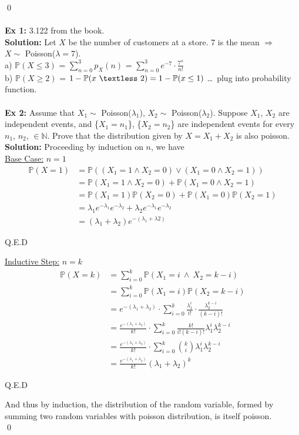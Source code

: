\documentclass{article}
\newcommand{\N}{\mathbb{N}}
\newcommand{\bbP}{\mathbb{P}}
\newcommand{\la}{\lambda}
\newcommand{\lt}{\textless}
\newcommand{\imply}{\Rightarrow}
\newcommand{\x}{\cdot}
\begin{document}
\qed\\\\
\textbf{Ex 1:} 3.122 from the book.\\
\textbf{Solution:} Let $X$ be the number of customers at a store. 7 is the mean $\imply$ \\$X \sim$ Poisson($\la =7$).\\
a) $\bbP(X\leq 3)$ = $\sum_{n=0}^{3} p_{X}(n)$ = $\sum_{n=0}^{3} e^{-7}\x \frac{7^{n}}{n!}$\\
b) $\bbP(X\geq 2)$ = $1-\bbP(x\ \lt\ 2) = 1-\bbP(x\leq 1)$ \dots\ plug into probability function. \\\\
\textbf{Ex 2:} Assume that $X_{1} \sim$ Poisson($\la_{1}$), $X_{2} \sim$ Poisson($\la_{2}$). Suppose $X_{1}$, $X_{2}$ are independent events, and \{$X_{1} = n_{1}$\}, \{$X_{2} = n_{2}$\} are independent events for every $n_{1}$, $n_{2}$, $\in \N$. Prove that the distribution given by $X = X_{1} + X_{2}$ is also poisson.\\
\textbf{Solution:} Proceeding by induction on $n$, we have\\
\underline{Base Case:} $n=1$
\begin{align*}
	\bbP(X=1) &= \bbP((X_{1} = 1 \wedge X_{2} = 0)\vee (X_{1} = 0 \wedge X_{2} = 1))\\
			&= \bbP(X_{1} = 1 \wedge X_{2} = 0) + \bbP(X_{1} = 0 \wedge X_{2} = 1)\\
			&= \bbP(X_{1} = 1) \bbP(X_{2} = 0) + \bbP(X_{1} = 0) \bbP(X_{2} = 1)\\
			&= \la_{1}e^{-\la_{1}}e^{-\la_{2}} + \la_{2}e^{-\la_{1}}e^{-\la_{2}}\\
			&= (\la_{1} + \la_{2})e^{-(\la_{1} + \la{2})}
\end{align*}
\begin{flushright}
Q.E.D
\end{flushright}
\underline{Inductive Step:} $n=k$
\begin{align*}
	\bbP(X=k) &= \sum_{i=0}^{k} \bbP(X_{1}=i\ \wedge\ X_{2}=k-i)\\
			&= \sum_{i=0}^{k} \bbP(X_{1}=i)\bbP(X_{2}=k-i)\\
			&= e^{-(\la_{1} + \la_{2})}\x \sum_{i=0}^{k} \frac{\la_{1}^{i}}{i!}\x \frac{\la_{2}^{k-i}}{(k-i)!}\\
			&= \frac{e^{-(\la_{1}+\la_{2})}}{k!}\x \sum_{i=0}^{k} \frac{k!}{i!(k-i)!} \la_{1}^{i}\la_{2}^{k-i}\\
			&= \frac{e^{-(\la_{1}+\la_{2})}}{k!}\x \sum_{i=0}^{k} {k\choose i} \la_{1}^{i}\la_{2}^{k-i}\\
			&= \frac{e^{-(\la_{1}+\la_{2})}}{k!}(\la_{1}+\la_{2})^{k}
\end{align*}
\begin{flushright}
Q.E.D
\end{flushright}
And thus by induction, the distribution of the random variable, formed by summing two random variables with poisson distribution, is itself poisson.\\
\qed\\\\\\
\end{document}
